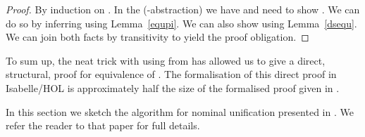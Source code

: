\begin{isabellebody}
\begin{isamarkuptext}
  \begin{proof}
  By induction on . In the (-abstraction) we 
  have  and need to show . We can 
  do so by inferring  using Lemma~\ref{equpi}.
  We can also show  using Lemma~\ref{dsequ}. 
  We can join both facts by transitivity to yield the proof obligation.
  \end{proof}

  \noindent
  To sum up, the neat trick with using  from \cite{KumarNorrish10} has allowed us
  to give a direct, structural,  proof for equivalence of . The formalisation of this
  direct proof in Isabelle/HOL is approximately half the size of the formalised proof given 
  in \cite{UrbanPittsGabbay04}.\end{isamarkuptext}\isamarkuptrue {}
\isamarkuptrue \begin{isamarkuptext}In this section we sketch the algorithm for nominal unification presented in \cite{UrbanPittsGabbay04}. 
  We refer the reader to that paper for full details.


\end{isamarkuptext}
\end{isabellebody}
